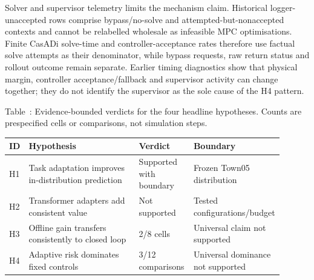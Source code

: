 Solver and supervisor telemetry limits the mechanism claim. Historical
logger-unaccepted rows comprise bypass/no-solve and attempted-but-nonaccepted
contexts and cannot be relabelled wholesale as infeasible MPC optimisations.
Finite CasADi solve-time and controller-acceptance rates therefore use factual
solve attempts as their denominator, while bypass requests, raw return status
and rollout outcome remain separate. Earlier timing diagnostics show that
physical margin, controller acceptance/fallback and supervisor activity can
change together; they do not identify the supervisor as the sole cause of the
H4 pattern.



\begin{samepage}
\begin{center}
  \label{tab:hypotheses}
  \small
  Table~\thetable: Evidence-bounded verdicts for the four headline
  hypotheses. Counts are prespecified cells or comparisons, not simulation
  steps.\par\smallskip
  \begin{tabular}{@{}L{0.06\linewidth}L{0.46\linewidth}L{0.20\linewidth}L{0.18\linewidth}@{}}
    \toprule
    ID & Hypothesis & Verdict & Boundary \\
    \midrule
    H1 & Task adaptation improves in-distribution prediction & Supported with boundary & Frozen Town05 distribution \\
    H2 & Transformer adapters add consistent value & Not supported & Tested configurations/budget \\
    H3 & Offline gain transfers consistently to closed loop & 2/8 cells & Universal claim not supported \\
    H4 & Adaptive risk dominates fixed controls & 3/12 comparisons & Universal dominance not supported \\
    \bottomrule
\end{tabular}
\end{center}
\end{samepage}
